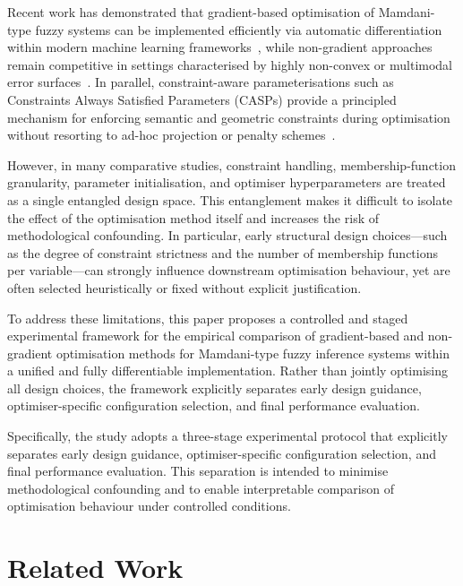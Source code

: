 \documentclass[conference]{IEEEtran}
\begin{document}
Recent work has demonstrated that gradient-based optimisation of Mamdani-type
fuzzy systems can be implemented efficiently via automatic differentiation
within modern machine learning frameworks~\cite{chen2024gradient}, while
non-gradient approaches remain competitive in settings characterised by
highly non-convex or multimodal error surfaces~\cite{zhou2023stochastic}.
In parallel, constraint-aware parameterisations such as Constraints Always
Satisfied Parameters (CASPs) provide a principled mechanism for enforcing
semantic and geometric constraints during optimisation without resorting to
ad-hoc projection or penalty schemes~\cite{chen2025casp}.

However, in many comparative studies, constraint handling, membership-function
granularity, parameter initialisation, and optimiser hyperparameters are
treated as a single entangled design space.
This entanglement makes it difficult to isolate the effect of the optimisation
method itself and increases the risk of methodological confounding.
In particular, early structural design choices—such as the degree of
constraint strictness and the number of membership functions per variable—can
strongly influence downstream optimisation behaviour, yet are often selected
heuristically or fixed without explicit justification.

To address these limitations, this paper proposes a controlled and staged
experimental framework for the empirical comparison of gradient-based and
non-gradient optimisation methods for Mamdani-type fuzzy inference systems
within a unified and fully differentiable implementation.
Rather than jointly optimising all design choices, the framework explicitly
separates early design guidance, optimiser-specific configuration selection,
and final performance evaluation.

Specifically, the study adopts a three-stage experimental protocol that
explicitly separates early design guidance, optimiser-specific configuration
selection, and final performance evaluation.
This separation is intended to minimise methodological confounding and to
enable interpretable comparison of optimisation behaviour under controlled
conditions.



\section{Related Work}
\end{document}
